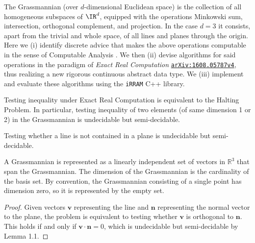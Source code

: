 \documentclass[12pt]{article}
\newcommand{\R}{\mathbb{R}}
\newcommand{\arXiv}[1]{\href{http://arXiv.org/abs/#1}{\textup{\texttt{arXiv:#1}}}\xspace}
\newenvironment{definition}[2][Definition]{\begin{trivlist}
\item[\hskip \labelsep {\bfseries #1}\hskip \labelsep {\bfseries #2.}]}{\end{trivlist}}
\newenvironment{corollary}[2][Corollary]{\begin{trivlist}
\item[\hskip \labelsep {\bfseries #1}\hskip \labelsep {\bfseries #2.}]}{\end{trivlist}}
\newenvironment{lemma}[2][Lemma]{\begin{trivlist}
\item[\hskip \labelsep {\bfseries #1}\hskip \labelsep {\bfseries #2.}]}{\end{trivlist}}
\begin{document}
 
 
\title{}
\author{Seokbin Lee, 20160464}
\maketitle

The Grassmannian (over $d$-dimensional Euclidean space) is the collection of all homogeneous subspaces of $\IR^d$,
equipped with the operations Minkowski sum, intersection, orthogonal complement, and projection.
In the case $d=3$ it consists, apart from the trivial and whole space, of all lines and planes through the origin.
Here we (i) identify discrete advice \cite{Zie12} that makes the above operations computable in the sense of Computable Analysis \cite{Wei00}. We then (ii) devise algorithms for said operations in the paradigm of \emph{Exact Real Computation} \arXiv{1608.05787v4}, thus realizing a new rigorous continuous abstract data type.
We (iii) implement and evaluate these algorithms using the \texttt{iRRAM} C++ library.

\begin{lemma}{1.1}
Testing inequality under Exact Real Computation is equivalent to the Halting Problem. In particular, testing inequality of two elements (of same dimension 1 or 2) in the Grassmannian is undecidable but semi-decidable.
\end{lemma}

\begin{corollary}{1.2}
Testing whether a line is not contained in a plane is undecidable but semi-decidable.
\end{corollary}

\begin{definition}{1.3}
A Grassmannian is represented as a linearly independent set of vectors in \(\R^3\) that span the Grassmannian. The dimension of the Grassmannian is the cardinality of the basis set. By convention, the Grassmannian consisting of a single point has dimension zero, so it is represented by the empty set.
\end{definition}

\begin{proof}
Given vectors \(\mathbf{v}\) representing the line and \(\mathbf{n}\) representing the normal vector to the plane, the problem is equivalent to testing whether \(\mathbf{v}\) is orthogonal to \(\mathbf{n}\). This holds if and only if \(\mathbf{v} \cdot \mathbf{n} = 0\), which is undecidable but semi-decidable by Lemma 1.1.
\end{proof}
\end{document}
